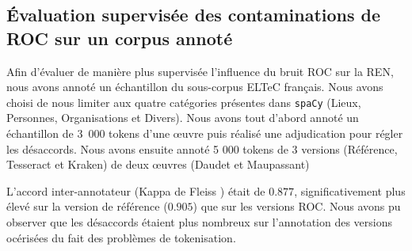 

\subsection{\'Evaluation supervisée des contaminations de ROC sur un corpus annoté}
\label{subsec:eval_supervis_OCR-IMPACT-NER}
Afin d'évaluer de manière plus supervisée l'influence du bruit ROC sur la REN, nous avons annoté un échantillon du sous-corpus ELTeC français.
 Nous avons choisi de nous limiter aux quatre catégories présentes dans \texttt{spaCy} (Lieux, Personnes, Organisations et Divers).
  Nous avons tout d'abord annoté un échantillon de 3~000 tokens d'une œuvre  puis réalisé une adjudication pour régler les désaccords. 
  Nous avons ensuite annoté 5 000 tokens de 3 versions (Référence, Tesseract et Kraken) de deux œuvres (Daudet et Maupassant)

L'accord inter-annotateur (Kappa de  Fleiss \cite{fleiss2013statistical}) était de $0.877$, significativement plus élevé sur la version de référence ($0.905$) que sur les versions ROC. Nous avons pu observer que les désaccords étaient plus nombreux sur l'annotation des versions océrisées du fait des problèmes de tokenisation.

